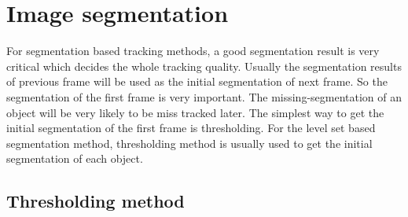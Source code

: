 \chapter{Image segmentation}
For segmentation based tracking methods, a good segmentation result is very critical which decides the whole tracking quality. Usually the segmentation results of previous frame will be used as the initial segmentation of next frame. So the segmentation of the first frame is very important. The missing-segmentation of an object will be very likely to be miss tracked later. The simplest way to get the initial segmentation of the first frame is thresholding. For the level set based segmentation method, thresholding method is usually used to get the initial segmentation of each object.
\section{Thresholding method}
